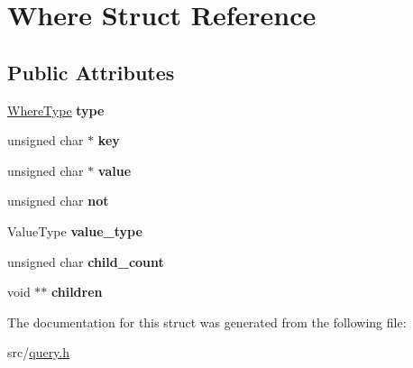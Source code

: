 \hypertarget{struct_where}{}\section{Where Struct Reference}
\label{struct_where}
\subsection*{Public Attributes}
\begin{DoxyCompactItemize}
\item 
\hypertarget{struct_where_aaed6b2878aee96fe201fb2f742263ffc}{}\hyperlink{query_8h_a5f007a3fe5613ea1d283e0f5b9b1fdf6}{Where\+Type} {\bfseries type}\label{struct_where_aaed6b2878aee96fe201fb2f742263ffc}

\item 
\hypertarget{struct_where_acc56730a928e427386a12d774daed6f4}{}unsigned char $\ast$ {\bfseries key}\label{struct_where_acc56730a928e427386a12d774daed6f4}

\item 
\hypertarget{struct_where_a0cde10d3f5c5539ce110c8db2c22a0aa}{}unsigned char $\ast$ {\bfseries value}\label{struct_where_a0cde10d3f5c5539ce110c8db2c22a0aa}

\item 
\hypertarget{struct_where_af875188cf4d8323816057033f7ef4c89}{}unsigned char {\bfseries not}\label{struct_where_af875188cf4d8323816057033f7ef4c89}

\item 
\hypertarget{struct_where_a10bb3d6cdf41f7844b6f93a7f794e48a}{}Value\+Type {\bfseries value\+\_\+type}\label{struct_where_a10bb3d6cdf41f7844b6f93a7f794e48a}

\item 
\hypertarget{struct_where_adcde741e6892e6f5cbde454c204771b0}{}unsigned char {\bfseries child\+\_\+count}\label{struct_where_adcde741e6892e6f5cbde454c204771b0}

\item 
\hypertarget{struct_where_a703bc718d62931c8bf2edf1bc6924c61}{}void $\ast$$\ast$ {\bfseries children}\label{struct_where_a703bc718d62931c8bf2edf1bc6924c61}

\end{DoxyCompactItemize}


The documentation for this struct was generated from the following file\+:\begin{DoxyCompactItemize}
\item 
src/\hyperlink{query_8h}{query.\+h}\end{DoxyCompactItemize}
